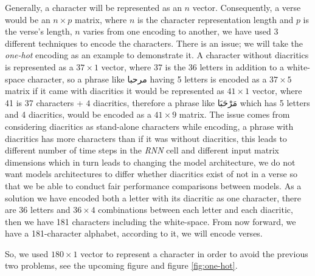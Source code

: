 \documentclass[12pt]{report}
\begin{document}
Generally, a character will be represented as an $n$ vector. Consequently, a
verse would be an $n \times p$ matrix, where $n$ is the character representation
length  and $p$ is the verse's length,
$n$ varies from one encoding to another, we have used 3 different
techniques to encode the characters.
There is an issue; we will take the \textit{one-hot} encoding as an example to
demonstrate it.  A character without diacritics is represented as a $37 \times 1$
vector, where 37 is the 36 letters in addition to a white-space character, so a
phrase like \textarabic{مرحبا} having 5 letters is encoded as a $37 \times 5$
matrix if it came with diacritics it would be represented as $41 \times 1$
vector, where 41 is 37 characters + $4$ diacritics, therefore  a phrase like
\textarabic{مَرْحَبَا} which has 5 letters and 4 diacritics, would be encoded as a
$41 \times 9$ matrix.  The issue comes from considering diacritics as stand-alone
characters while encoding, a phrase with diacritics has more characters than if
it was without diacritics, this leads to different number of time steps in the
\textit{RNN} cell and different input matrix dimensions which in turn leads to
changing the model architecture, we do not want models architectures to differ
whether diacritics exist of not in a verse so that we be able to conduct
fair performance comparisons between models. 
As a solution we have encoded both a letter with its diacritic as one character,
there are 36 letters and $36 \times 4$ combinations between each letter and each
diacritic, then we have 181 characters including the white-space. From now
forward, we have a 181-character alphabet, according to it, we will encode verses.

So, we used $180 \times 1$ vector to represent a character in order to avoid the
previous two problems, see the upcoming figure  and figure
\ref{fig:one-hot}.





\begin{figure}

\hfill

\end{figure}
\end{document}
